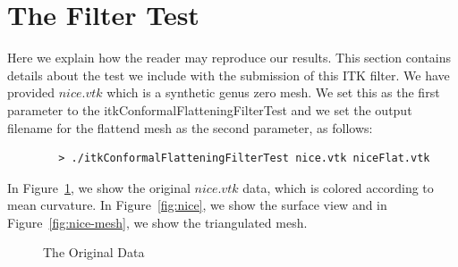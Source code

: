 \documentclass{InsightArticle}
\begin{document}
	\section{The Filter Test}
  Here we explain how the reader may reproduce our results. This
  section contains details about the test we include with the
  submission of this ITK filter. We have provided $nice.vtk$ which is
  a synthetic genus zero mesh. We set this as the first parameter to
  the itkConformalFlatteningFilterTest and we set the output filename
  for the flattend mesh as the second parameter, as follows:

	\begin{verbatim}
		> ./itkConformalFlatteningFilterTest nice.vtk niceFlat.vtk
	\end{verbatim}

  \noindent In Figure~\ref{fig:original}, we show the original
  $nice.vtk$ data, which is colored according to mean curvature. In
  Figure~\ref{fig:nice}, we show the surface view and in
  Figure~\ref{fig:nice-mesh}, we show the triangulated mesh.

  \begin{figure}[t]
		\begin{center}
    \end{center}
    \vspace{-.25in} \caption{The Original Data} \label{fig:original}
  \end{figure}  
\end{document}
